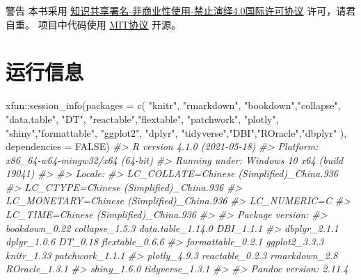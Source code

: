 \documentclass[
]{book}
\newenvironment{Shaded}{\begin{snugshade}}{\end{snugshade}}
\newcommand{\AttributeTok}[1]{\textcolor[rgb]{0.77,0.63,0.00}{#1}}
\newcommand{\CommentTok}[1]{\textcolor[rgb]{0.56,0.35,0.01}{\textit{#1}}}
\newcommand{\ConstantTok}[1]{\textcolor[rgb]{0.00,0.00,0.00}{#1}}
\newcommand{\FunctionTok}[1]{\textcolor[rgb]{0.00,0.00,0.00}{#1}}
\newcommand{\NormalTok}[1]{#1}
\newcommand{\SpecialCharTok}[1]{\textcolor[rgb]{0.00,0.00,0.00}{#1}}
\newcommand{\StringTok}[1]{\textcolor[rgb]{0.31,0.60,0.02}{#1}}
\begin{document}
\begin{rmdwarn}{警告}
本书采用 \href{https://creativecommons.org/licenses/by-nc-nd/4.0/}{知识共享署名-非商业性使用-禁止演绎4.0国际许可协议} 许可，请君自重。
项目中代码使用 \href{https://github.com/zyf19940501/Rbook}{MIT协议} 开源。

\end{rmdwarn}

\hypertarget{session}{%
\section*{运行信息}\label{session}}

\begin{Shaded}
\begin{Highlighting}[]
\NormalTok{xfun}\SpecialCharTok{::}\FunctionTok{session\_info}\NormalTok{(}\AttributeTok{packages =} \FunctionTok{c}\NormalTok{(}
  \StringTok{"knitr"}\NormalTok{, }\StringTok{"rmarkdown"}\NormalTok{, }\StringTok{"bookdown"}\NormalTok{,}\StringTok{"collapse"}\NormalTok{,}
  \StringTok{"data.table"}\NormalTok{, }\StringTok{"DT"}\NormalTok{, }\StringTok{"reactable"}\NormalTok{,}\StringTok{"flextable"}\NormalTok{,}
  \StringTok{"patchwork"}\NormalTok{, }\StringTok{"plotly"}\NormalTok{, }\StringTok{"shiny"}\NormalTok{,}\StringTok{"formattable"}\NormalTok{,}
  \StringTok{"ggplot2"}\NormalTok{, }\StringTok{"dplyr"}\NormalTok{, }\StringTok{"tidyverse"}\NormalTok{,}\StringTok{"DBI"}\NormalTok{,}\StringTok{"ROracle"}\NormalTok{,}\StringTok{"dbplyr"}
\NormalTok{), }\AttributeTok{dependencies =} \ConstantTok{FALSE}\NormalTok{)}
\CommentTok{\#\textgreater{} R version 4.1.0 (2021{-}05{-}18)}
\CommentTok{\#\textgreater{} Platform: x86\_64{-}w64{-}mingw32/x64 (64{-}bit)}
\CommentTok{\#\textgreater{} Running under: Windows 10 x64 (build 19041)}
\CommentTok{\#\textgreater{} }
\CommentTok{\#\textgreater{} Locale:}
\CommentTok{\#\textgreater{}   LC\_COLLATE=Chinese (Simplified)\_China.936 }
\CommentTok{\#\textgreater{}   LC\_CTYPE=Chinese (Simplified)\_China.936   }
\CommentTok{\#\textgreater{}   LC\_MONETARY=Chinese (Simplified)\_China.936}
\CommentTok{\#\textgreater{}   LC\_NUMERIC=C                              }
\CommentTok{\#\textgreater{}   LC\_TIME=Chinese (Simplified)\_China.936    }
\CommentTok{\#\textgreater{} }
\CommentTok{\#\textgreater{} Package version:}
\CommentTok{\#\textgreater{}   bookdown\_0.22     collapse\_1.5.3    data.table\_1.14.0 DBI\_1.1.1        }
\CommentTok{\#\textgreater{}   dbplyr\_2.1.1      dplyr\_1.0.6       DT\_0.18           flextable\_0.6.6  }
\CommentTok{\#\textgreater{}   formattable\_0.2.1 ggplot2\_3.3.3     knitr\_1.33        patchwork\_1.1.1  }
\CommentTok{\#\textgreater{}   plotly\_4.9.3      reactable\_0.2.3   rmarkdown\_2.8     ROracle\_1.3.1    }
\CommentTok{\#\textgreater{}   shiny\_1.6.0       tidyverse\_1.3.1  }
\CommentTok{\#\textgreater{} }
\CommentTok{\#\textgreater{} Pandoc version: 2.11.4}
\end{Highlighting}
\end{Shaded}
\end{document}
